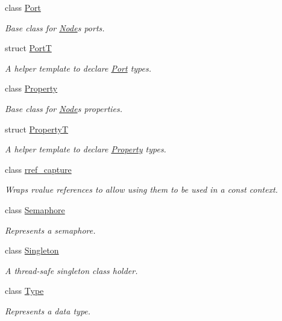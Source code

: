 \begin{DoxyCompactItemize}
class \hyperlink{classdg_1_1deepcore_1_1_port}{Port}
\begin{DoxyCompactList}\small\item\em Base class for \hyperlink{classdg_1_1deepcore_1_1_node}{Node}\textquotesingle{}s ports. \end{DoxyCompactList}\item 
struct \hyperlink{structdg_1_1deepcore_1_1_port_t}{PortT}
\begin{DoxyCompactList}\small\item\em A helper template to declare \hyperlink{classdg_1_1deepcore_1_1_port}{Port} types. \end{DoxyCompactList}\item 
class \hyperlink{classdg_1_1deepcore_1_1_property}{Property}
\begin{DoxyCompactList}\small\item\em Base class for \hyperlink{classdg_1_1deepcore_1_1_node}{Node}\textquotesingle{}s properties. \end{DoxyCompactList}\item 
struct \hyperlink{structdg_1_1deepcore_1_1_property_t}{PropertyT}
\begin{DoxyCompactList}\small\item\em A helper template to declare \hyperlink{classdg_1_1deepcore_1_1_property}{Property} types. \end{DoxyCompactList}\item 
class \hyperlink{classdg_1_1deepcore_1_1rref__capture}{rref\+\_\+capture}
\begin{DoxyCompactList}\small\item\em Wraps rvalue references to allow using them to be used in a {\ttfamily const} context. \end{DoxyCompactList}\item 
class \hyperlink{classdg_1_1deepcore_1_1_semaphore}{Semaphore}
\begin{DoxyCompactList}\small\item\em Represents a semaphore. \end{DoxyCompactList}\item 
class \hyperlink{classdg_1_1deepcore_1_1_singleton}{Singleton}
\begin{DoxyCompactList}\small\item\em A thread-\/safe singleton class holder. \end{DoxyCompactList}\item 
class \hyperlink{classdg_1_1deepcore_1_1_type}{Type}
\begin{DoxyCompactList}\small\item\em Represents a data type. \end{DoxyCompactList}\item 

\end{DoxyCompactItemize}
